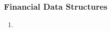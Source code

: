 \subsubsection{Financial Data Structures}

\begin{remark} 
\begin{enumerate}[label=\roman*.]
\setlength{\itemsep}{0pt}
\item
\end{enumerate}
\end{remark}